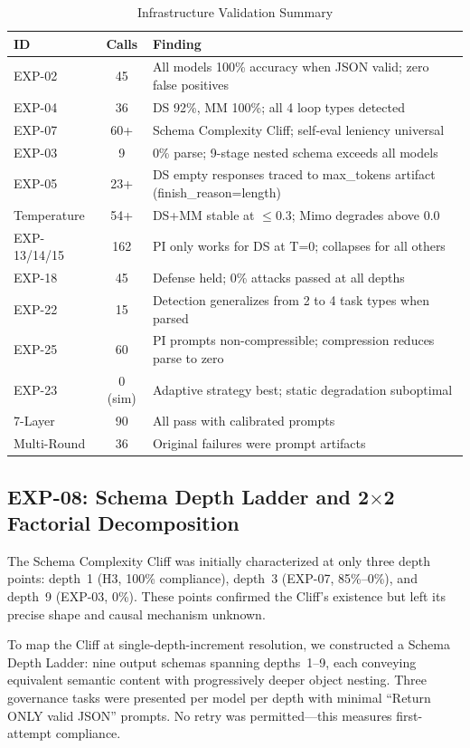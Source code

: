 \documentclass[11pt,a4paper]{article}
\begin{document}
\begin{table}[htbp]\centering\caption{Infrastructure Validation Summary}\small
\begin{tabular}{lcp{5cm}}\toprule\textbf{ID} & \textbf{Calls} & \textbf{Finding}\\\midrule
EXP-02 & 45 & All models 100\% accuracy when JSON valid; zero false positives\\
EXP-04 & 36 & DS 92\%, MM 100\%; all 4 loop types detected\\
EXP-07 & 60+ & Schema Complexity Cliff; self-eval leniency universal\\
EXP-03 & 9 & 0\% parse; 9-stage nested schema exceeds all models\\
EXP-05 & 23+ & DS empty responses traced to max\_tokens artifact (finish\_reason=length)\\
Temperature & 54+ & DS+MM stable at $\leq$0.3; Mimo degrades above 0.0\\
EXP-13/14/15 & 162 & PI only works for DS at T=0; collapses for all others\\
EXP-18 & 45 & Defense held; 0\% attacks passed at all depths\\
EXP-22 & 15 & Detection generalizes from 2 to 4 task types when parsed\\
EXP-25 & 60 & PI prompts non-compressible; compression reduces parse to zero\\
EXP-23 & 0 (sim) & Adaptive strategy best; static degradation suboptimal\\
7-Layer & 90 & All pass with calibrated prompts\\
Multi-Round & 36 & Original failures were prompt artifacts\\\bottomrule
\end{tabular}
\end{table}

\subsection{EXP-08: Schema Depth Ladder and 2$\times$2 Factorial Decomposition}

The Schema Complexity Cliff was initially characterized at only three depth points: depth~1 (H3, 100\% compliance), depth~3 (EXP-07, 85\%--0\%), and depth~9 (EXP-03, 0\%). These points confirmed the Cliff's existence but left its precise shape and causal mechanism unknown.

To map the Cliff at single-depth-increment resolution, we constructed a Schema Depth Ladder: nine output schemas spanning depths~1--9, each conveying equivalent semantic content with progressively deeper object nesting. Three governance tasks were presented per model per depth with minimal ``Return ONLY valid JSON'' prompts. No retry was permitted---this measures first-attempt compliance.
\end{document}
